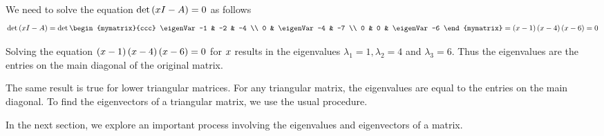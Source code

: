 \begin{solution}
We need to solve the equation $\det \left(x I - A \right) = 0$ as follows
\begin{eqnarray*}
\det \tup{\eigenVar I - A } =
\det \begin{mymatrix}{ccc}
\eigenVar -1 & -2 & -4 \\
0 & \eigenVar-4 & -7 \\
0 & 0 & \eigenVar-6
\end{mymatrix} =\tup{\eigenVar-1 } \tup{\eigenVar-4 } \tup{\eigenVar-6 } =0
\end{eqnarray*}

Solving the equation $\left(x-1 \right) \left(x-4
\right) \left(x-6 \right) = 0$ for $x$ results in the eigenvalues 
$\lambda_1 = 1, \lambda_2 = 4$ and $\lambda_3 = 6$.  Thus the
eigenvalues are the entries on the main diagonal of the original
matrix.
\end{solution}

The same result is true for lower triangular matrices. For any triangular matrix,
the eigenvalues are equal to the entries on the main diagonal. To find the 
eigenvectors of a triangular matrix, we use the usual procedure. 

In the next section, we explore an important process involving the eigenvalues and eigenvectors of a matrix. 